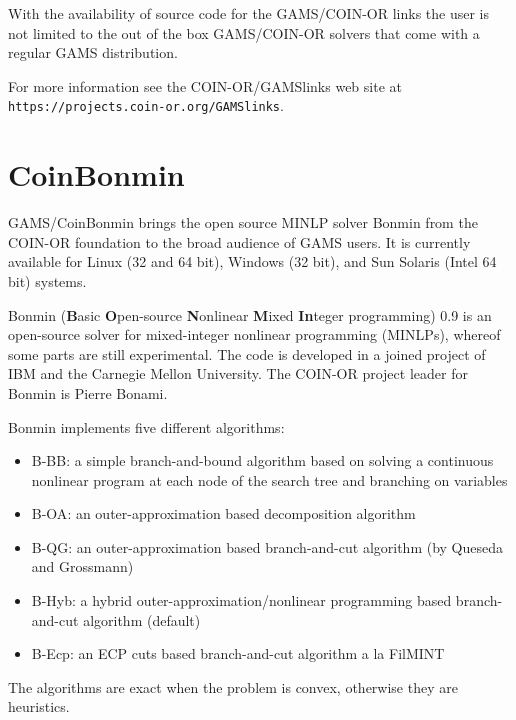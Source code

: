 With the availability of source code for the GAMS/COIN-OR links the user is not limited to the out of the box GAMS/COIN-OR solvers that come with a regular GAMS distribution.
% 

For more information see the COIN-OR/GAMSlinks web site at
\texttt{https://projects.coin-or.org/GAMSlinks}.

\section{CoinBonmin}

GAMS/CoinBonmin brings the open source MINLP solver Bonmin from the COIN-OR foundation to the broad audience of GAMS users.
It is currently available for Linux (32 and 64 bit), Windows (32 bit), and Sun Solaris (Intel 64 bit) systems.

Bonmin (\textbf{B}asic \textbf{O}pen-source \textbf{N}onlinear \textbf{M}ixed \textbf{In}teger programming) 0.9 is an open-source solver for mixed-integer nonlinear programming (MINLPs), whereof some parts are still experimental.
The code is developed in a joined project of IBM and the Carnegie Mellon University.
The COIN-OR project leader for Bonmin is Pierre Bonami.

Bonmin implements five different algorithms:
\begin{itemize}
\item {B-BB}: a simple branch-and-bound algorithm based on solving a continuous nonlinear program at each node of the search tree and branching on variables
\item {B-OA}: an outer-approximation based decomposition algorithm
\item {B-QG}: an outer-approximation based branch-and-cut algorithm (by Queseda and Grossmann)
\item {B-Hyb}: a hybrid outer-approximation/nonlinear programming based branch-and-cut algorithm (default)
\item {B-Ecp}: an ECP cuts based branch-and-cut algorithm a la FilMINT
\end{itemize}
The algorithms are exact when the problem is convex, otherwise they are heuristics.


